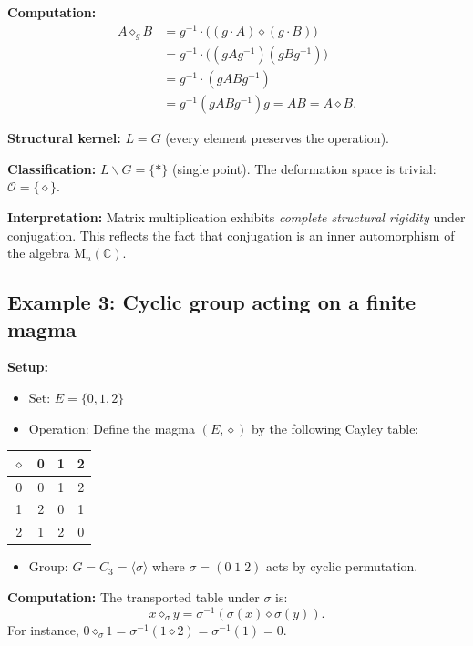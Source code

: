 \documentclass[11pt,a4paper]{article}
\begin{document}
	\textbf{Computation:}
	\begin{align*}
		A \diamond_g B &= g^{-1} \cdot \big((g \cdot A) \diamond (g \cdot B)\big) \\
		&= g^{-1} \cdot \big((gAg^{-1})(gBg^{-1})\big) \\
		&= g^{-1} \cdot (gABg^{-1}) \\
		&= g^{-1}(gABg^{-1})g = AB = A \diamond B.
	\end{align*}
	
	\textbf{Structural kernel:} $L = G$ (every element preserves the operation).
	
	\textbf{Classification:} $L\backslash G = \{*\}$ (single point). The deformation space is trivial: $\mathcal{O} = \{\diamond\}$.
	
	\textbf{Interpretation:} Matrix multiplication exhibits \emph{complete structural rigidity} under conjugation. This reflects the fact that conjugation is an inner automorphism of the algebra $\mathrm{M}_n(\mathbb{C})$.
	
	\subsection{Example 3: Cyclic group acting on a finite magma}
	
	\textbf{Setup:}
	\begin{itemize}[nosep]
		\item Set: $E = \{0, 1, 2\}$
		\item Operation: Define the magma $(E, \diamond)$ by the following Cayley table:
	\end{itemize}
	
	\begin{center}
		\begin{tabular}{c|ccc}
			$\diamond$ & 0 & 1 & 2 \\ \hline
			0 & 0 & 1 & 2 \\
			1 & 2 & 0 & 1 \\
			2 & 1 & 2 & 0
		\end{tabular}
	\end{center}
	
	\begin{itemize}[nosep]
		\item Group: $G = C_3 = \langle \sigma \rangle$ where $\sigma = (0\;1\;2)$ acts by cyclic permutation.
	\end{itemize}
	
	\textbf{Computation:} The transported table under $\sigma$ is:
	\[
	x \diamond_\sigma y = \sigma^{-1}(\sigma(x) \diamond \sigma(y)).
	\]
	For instance, $0 \diamond_\sigma 1 = \sigma^{-1}(1 \diamond 2) = \sigma^{-1}(1) = 0$.
	
\end{document}
